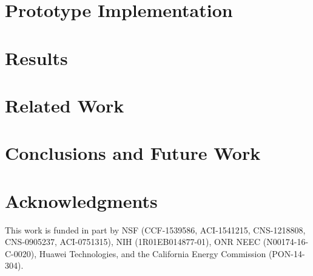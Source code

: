 \documentclass[letterpaper]{sig-alternate-2013}
\begin{document}
\section{Prototype Implementation}
\label{sec:impl}


\section{Results}
\label{sec:results}


\section{Related Work}
\label{sec:related_work}


\section{Conclusions and Future Work}
\label{sec:conclusion}


\section{Acknowledgments}
This work is funded in part by NSF (CCF-1539586, ACI-1541215, CNS-1218808, CNS-0905237, ACI-0751315), NIH (1R01EB014877-01), ONR NEEC (N00174-16-C-0020), Huawei Technologies, and the California Energy Commission (PON-14-304).

%

%

%
%
\end{document}
